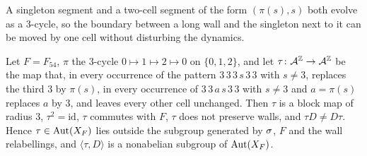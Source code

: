 A singleton segment and a two-cell segment of the form $(\pi(s),s)$ both evolve as a $3$-cycle, so the boundary between a long wall and the singleton next to it can be moved by one cell without disturbing the dynamics.

\begin{theorem}\label{thm:tau}
Let $F=F_{54}$, $\pi$ the $3$-cycle $0\mapsto1\mapsto2\mapsto0$ on $\{0,1,2\}$, and let $\tau\colon\mathcal{A}^{\mathbb{Z}}\to\mathcal{A}^{\mathbb{Z}}$ be the map that, in every occurrence of the pattern $3\,3\,3\,s\,3\,3$ with $s\ne3$, replaces the third $3$ by $\pi(s)$, in every occurrence of $3\,3\,a\,s\,3\,3$ with $s\ne3$ and $a=\pi(s)$ replaces $a$ by $3$, and leaves every other cell unchanged. Then $\tau$ is a block map of radius $3$, $\tau^2=\mathrm{id}$, $\tau$ commutes with $F$, $\tau$ does not preserve walls, and $\tau D\ne D\tau$. Hence $\tau\in\operatorname{Aut}(X_F)$ lies outside the subgroup generated by $\sigma$, $F$ and the wall relabellings, and $\langle\tau,D\rangle$ is a nonabelian subgroup of $\operatorname{Aut}(X_F)$.
\end{theorem}


